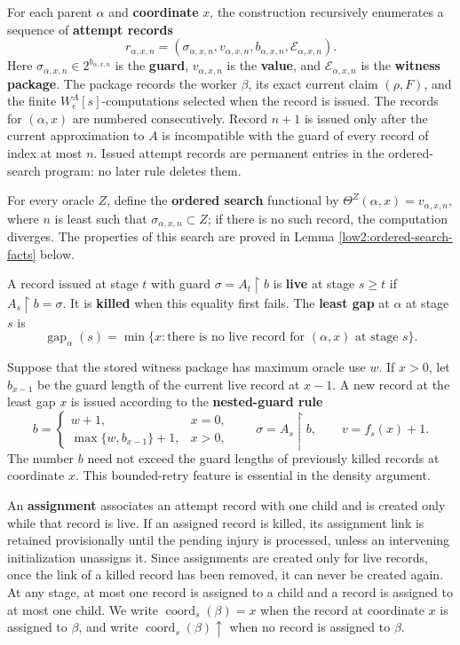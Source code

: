 \documentclass[10pt,a4paper]{amsart}
\begin{document}
For each parent $\alpha$ and \textbf{coordinate} $x$, the construction recursively
enumerates a sequence of \textbf{attempt records}
\[
 r_{\alpha,x,n}=
 (\sigma_{\alpha,x,n},v_{\alpha,x,n},b_{\alpha,x,n},
   \mathcal E_{\alpha,x,n}).
\]
Here $\sigma_{\alpha,x,n}\in2^{b_{\alpha,x,n}}$ is the \textbf{guard},
$v_{\alpha,x,n}$ is the \textbf{value}, and $\mathcal E_{\alpha,x,n}$ is the
\textbf{witness package}. The package records the worker $\beta$, its exact
current claim $(\rho,F)$, and the finite
$W_e^A[s]$-computations selected when the record is issued. The records for
$(\alpha,x)$ are numbered consecutively. Record $n+1$ is issued only after
the current approximation to $A$ is incompatible with the guard of every
record of index at most $n$. Issued attempt records are permanent entries in
the ordered-search program: no later rule deletes them.

For every oracle $Z$, define the \textbf{ordered search} functional by $\Theta^Z(\alpha,x)=v_{\alpha,x,n}$,
where $n$ is least such that $\sigma_{\alpha,x,n}\subset Z$; if there is no
such record, the computation diverges. The properties of this search are
proved in Lemma \ref{low2:ordered-search-facts} below.

A record issued at stage $t$ with guard $\sigma=A_t\upharpoonright b$ is
\textbf{live} at stage $s\geq t$ if $A_s\upharpoonright b=\sigma$. It is
\textbf{killed} when this equality first fails. The \textbf{least gap} at
$\alpha$ at stage $s$ is
\[
        \operatorname{gap}_\alpha(s)=
        \min\{x:\text{there is no live record for }(\alpha,x) \text{ at stage }s\}.
\]

Suppose that the stored witness package has maximum oracle use $w$. If $x>0$,
let $b_{x-1}$ be the guard length of the current live record at $x-1$. A new
record at the least gap $x$ is issued according to the \textbf{nested-guard
rule}
\begin{equation}\label{low2:nested-guard}
 b=
 \begin{cases}
     w+1, & x=0,\\
     \max\{w,b_{x-1}\}+1, & x>0,
 \end{cases}
 \qquad
 \sigma=A_s\upharpoonright b,
 \qquad
 v=f_s(x)+1.
\end{equation}
The number $b$ need not exceed the guard lengths of previously killed records
at coordinate $x$. This bounded-retry feature is essential in the density
argument.

An \textbf{assignment} associates an attempt record with one child and is
created only while that record is live. If an assigned record is killed, its
assignment link is retained provisionally until the pending injury is
processed, unless an intervening initialization unassigns it. Since
assignments are created only for live records, once the link of a killed
record has been removed, it can never be created again. At any stage, at most
one record is assigned to a child and a record is assigned to at most one
child. We write
$\operatorname{coord}_s(\beta)=x$ when the record at coordinate $x$ is
assigned to $\beta$, and write $\operatorname{coord}_s(\beta)\uparrow$ when
no record is assigned to $\beta$.
\end{document}
